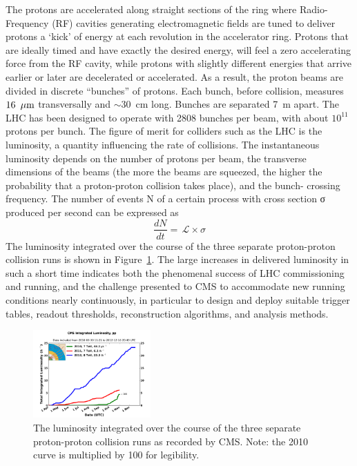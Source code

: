 \indent The protons are accelerated along straight sections of the ring where 
Radio-Frequency (RF) cavities generating electromagnetic fields are 
tuned to deliver protons a ‘kick’ of energy at each revolution in the accelerator ring. 
Protons that are ideally timed and have exactly the desired energy, will feel 
a zero accelerating force from the RF cavity, while protons with slightly different 
energies that arrive earlier or later are decelerated or accelerated. As a result, 
the proton beams are divided in discrete ``bunches'' of protons. Each bunch, before collision,
measures $16~\,\mu\text{m}$ transversally and $\sim\!\!30$~cm long. Bunches are separated 7~m apart.
The LHC has been designed to operate with 2808 bunches per beam, with about $10^{11}$ protons per bunch. 
The figure of merit for colliders such as the LHC is the luminosity, a quantity 
influencing the rate of collisions. The instantaneous luminosity depends on the number of protons
per beam, the transverse dimensions of the beams (the more the beams are squeezed,
the higher the probability that a proton-proton collision takes place), and the bunch-
crossing frequency. The number of events N of a certain process with cross section σ
produced per second can be expressed as
%
\begin{equation}
  \label{eq:lumi}
  \frac{dN}{dt} = \,\mathcal{L} \times \sigma
\end{equation}
%
The luminosity integrated over the course of the three separate proton-proton collision runs
is shown in Figure~\ref{fig:int_lumi}. The large increases in delivered luminosity in such
a short time indicates both the phenomenal success of LHC commissioning and running, and 
the challenge presented to CMS to accommodate new running conditions nearly continuously, 
in particular to design and deploy suitable trigger tables, readout thresholds, 
reconstruction algorithms, and analysis methods.

\begin{figure}[h!]
  \begin{center}
      \includegraphics[width=0.40\textwidth,]{figures/int_lumi_cumulative_pp_2.png}
      \caption{\label{fig:int_lumi} The luminosity integrated over the course of the three 
      separate proton-proton collision runs as recorded by CMS.  
      Note: the 2010 curve is multiplied by 100 for legibility.}
  \end{center}
\end{figure}
